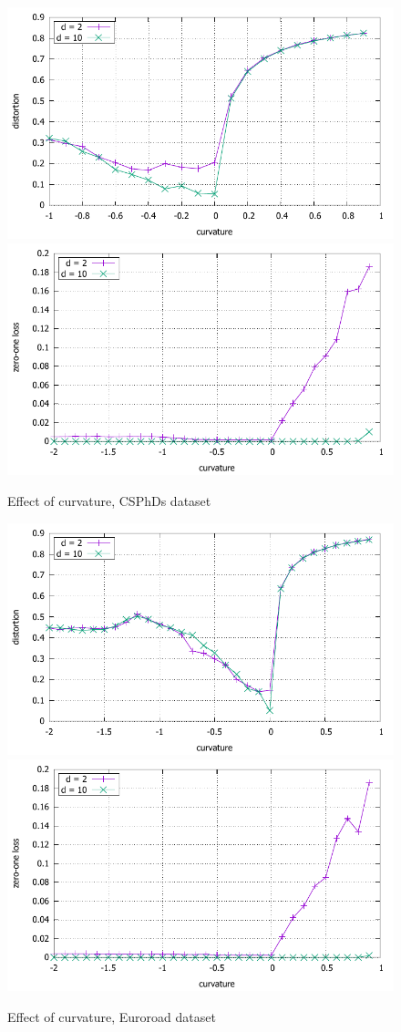 \documentclass{article} %
\begin{document}
\begin{figure}
    \centering
    \includegraphics[width = 0.49 \textwidth]{CSPhDs_distortion.pdf}
    \includegraphics[width = 0.49 \textwidth]{CSPhDs_zero_one.pdf}
    \caption{Effect of curvature, CSPhDs dataset}
    \label{fig:CSPhDs}
\end{figure}

\begin{figure}
    \centering
    \includegraphics[width = 0.49 \textwidth]{euroroad_distortion.pdf}
    \includegraphics[width = 0.49 \textwidth]{euroroad_zero_one.pdf}
    \caption{Effect of curvature, Euroroad dataset}
    \label{fig:euroroad}
\end{figure}
\end{document}

